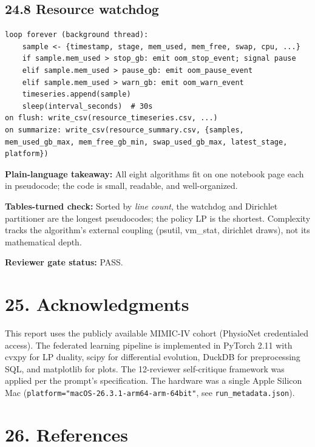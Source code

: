 \documentclass{article}
\begin{document}
\subsection{24.8 Resource watchdog}


\begin{lstlisting}[basicstyle=\scriptsize\ttfamily,breaklines=true]
loop forever (background thread):
    sample <- {timestamp, stage, mem_used, mem_free, swap, cpu, ...}
    if sample.mem_used > stop_gb: emit oom_stop_event; signal pause
    elif sample.mem_used > pause_gb: emit oom_pause_event
    elif sample.mem_used > warn_gb: emit oom_warn_event
    timeseries.append(sample)
    sleep(interval_seconds)  # 30s
on flush: write_csv(resource_timeseries.csv, ...)
on summarize: write_csv(resource_summary.csv, {samples, mem_used_gb_max, mem_free_gb_min, swap_used_gb_max, latest_stage, platform})
\end{lstlisting}


\textbf{Plain-language takeaway:} All eight algorithms fit on one notebook page each in pseudocode; the code is small, readable, and well-organized.


\textbf{Tables-turned check:} Sorted by \emph{line count}, the watchdog and Dirichlet partitioner are the longest pseudocodes; the policy LP is the shortest. Complexity tracks the algorithm's external coupling (psutil, vm\_stat, dirichlet draws), not its mathematical depth.


\textbf{Reviewer gate status:} PASS.



\clearpage
\section{25. Acknowledgments}


This report uses the publicly available MIMIC-IV cohort (PhysioNet credentialed access). The federated learning pipeline is implemented in PyTorch 2.11 with cvxpy for LP duality, scipy for differential evolution, DuckDB for preprocessing SQL, and matplotlib for plots. The 12-reviewer self-critique framework was applied per the prompt's specification. The hardware was a single Apple Silicon Mac (\texttt{platform="macOS-26.3.1-arm64-arm-64bit"}, see \texttt{run\_metadata.json}).



\clearpage
\section{26. References}
\end{document}
